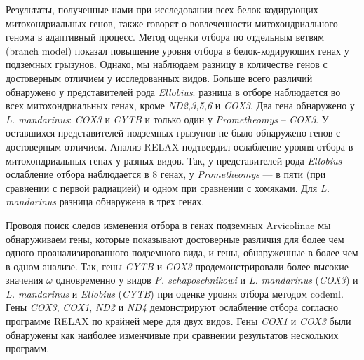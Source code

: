 Результаты, полученные нами при исследовании всех белок-кодирующих митохондриальных генов, также говорят о вовлеченности митохондриального генома в адаптивный процесс. Метод оценки отбора по отдельным ветвям (branch model) показал повышение уровня отбора в белок-кодирующих генах у подземных грызунов. Однако, мы наблюдаем разницу в количестве генов с достоверным отличием у исследованных видов. Больше всего различий обнаружено у представителей рода \textit{Ellobius}: разница в отборе наблюдается во всех митохондриальных генах, кроме \textit{ND2,3,5,6} и \textit{COX3}. Два гена обнаружено у \textit{L. mandarinus}: \textit{COX3} и \textit{CYTB} и только один у \textit{Prometheomys} -- \textit{COX3}. У оставшихся представителей подземных грызунов не было обнаружено генов с достоверным отличием. Анализ RELAX подтвердил ослабление уровня отбора в митохондриальных генах у разных видов. Так, у представителей рода \textit{Ellobius} ослабление отбора наблюдается в 8 генах, у \textit{Prometheomys} --- в пяти (при сравнении с первой радиацией) и одном при сравнении с хомяками. Для \textit{L. mandarinus} разница обнаружена в трех генах.  

Проводя поиск следов изменения отбора в генах подземных Arvicolinae мы обнаруживаем гены, которые показывают достоверные различия для более чем одного проанализированного подземного вида, и гены, обнаруженные в более чем в одном анализе. Так, гены \textit{CYTB} и \textit{COX3} продемонстрировали более высокие значения $\omega$ одновременно у видов \textit{P. schaposchnikowi} и \textit{L. mandarinus} (\textit{COX3}) и \textit{L. mandarinus} и \textit{Ellobius} (\textit{CYTB}) при оценке уровня отбора методом codeml. Гены \textit{COX3}, \textit{COX1}, \textit{ND2} и \textit{ND4} демонстрируют ослабление отбора согласно программе RELAX по крайней мере для двух видов. Гены \textit{COX1} и \textit{COX3} были обнаружены как наиболее изменчивые при сравнении результатов нескольких программ. 

